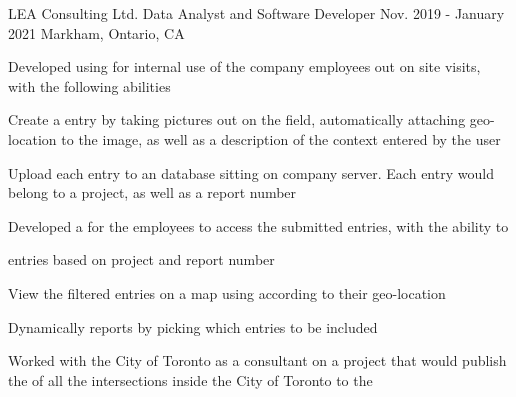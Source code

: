 

\begin{cventries}

  \cventry
  {LEA Consulting Ltd.} %
  {Data Analyst and Software Developer} %
  {Nov. 2019 - January 2021} %
  {Markham, Ontario, CA} %
  {
    \begin{cvitems} %
      \item {Developed  using  for internal use of the company employees out on site visits, with the following abilities}
        \begin{cvsubitems}
          \item {Create a entry by taking pictures out on the field, automatically attaching geo-location to the image, as well as a description of the context entered by the user}
          \item {Upload each entry to an  database sitting on company server. Each entry would belong to a project, as well as a report number}
        \end{cvsubitems}
      \item {Developed a  for the employees to access the submitted entries, with the ability to}
        \begin{cvsubitems}
          \item { entries based on project and report number}
          \item {View the filtered entries on a map using  according to their geo-location}
          \item {Dynamically  reports by picking which entries to be included}
        \end{cvsubitems}
      \item {Worked with the City of Toronto as a consultant on a project that would publish the  of all the intersections inside the City of Toronto to the }

\end{cvitems}}
\end{cventries}
